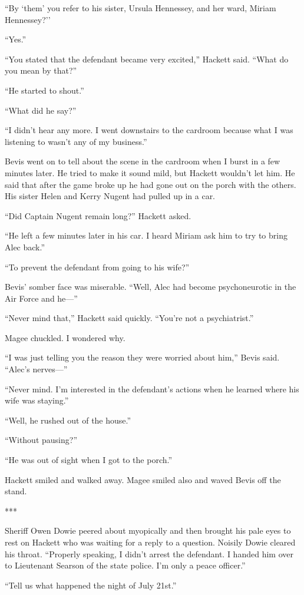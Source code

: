 \documentclass{novel}
\begin{document}
“By ‘them’ you refer to his sister, Ursula Hennessey, and her ward, Miriam Hennessey?’’

“Yes.”

“You stated that the defendant became very excited,” Hackett said. “What do you mean by that?”

“He started to shout.”

“What did he say?”

“I didn’t hear any more. I went downstairs to the cardroom because what I was listening to wasn’t any of my business.”

Bevis went on to tell about the scene in the cardroom when I burst in a few minutes later. He tried to make it sound mild, but Hackett wouldn’t let him. He said that after the game broke up he had gone out on the porch with the others. His sister Helen and Kerry Nugent had pulled up in a car.

“Did Captain Nugent remain long?” Hackett asked.

“He left a few minutes later in his car. I heard Miriam ask him to try to bring Alec back.”

“To prevent the defendant from going to his wife?”

Bevis’ somber face was miserable. “Well, Alec had become psychoneurotic in the Air Force and he—”

“Never mind that,” Hackett said quickly. “You’re not a psychiatrist.”

Magee chuckled. I wondered why.

“I was just telling you the reason they were worried about him,” Bevis said. “Alec’s nerves—”

“Never mind. I’m interested in the defendant’s actions when he learned where his wife was staying.”

“Well, he rushed out of the house.”

“Without pausing?”

“He was out of sight when I got to the porch.”

Hackett smiled and walked away. Magee smiled also and waved Bevis off the stand.

***

Sheriff Owen Dowie peered about myopically and then brought his pale eyes to rest on Hackett who was waiting for a reply to a question. Noisily Dowie cleared his throat. “Properly speaking, I didn’t arrest the defendant. I handed him over to Lieutenant Searson of the state police. I’m only a peace officer.”

“Tell us what happened the night of July 21st.”
\end{document}
